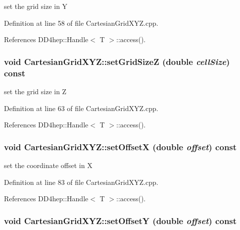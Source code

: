 set the grid size in Y 

Definition at line 58 of file CartesianGridXYZ.cpp.

References DD4hep::Handle$<$ T $>$::access().\hypertarget{class_d_d4hep_1_1_geometry_1_1_cartesian_grid_x_y_z_ac085488b1e2c7ebf657fe0ee6bc89c03}{
\subsubsection[{setGridSizeZ}]{\setlength{\rightskip}{0pt plus 5cm}void CartesianGridXYZ::setGridSizeZ (double {\em cellSize}) const}}
\label{class_d_d4hep_1_1_geometry_1_1_cartesian_grid_x_y_z_ac085488b1e2c7ebf657fe0ee6bc89c03}


set the grid size in Z 

Definition at line 63 of file CartesianGridXYZ.cpp.

References DD4hep::Handle$<$ T $>$::access().\hypertarget{class_d_d4hep_1_1_geometry_1_1_cartesian_grid_x_y_z_af10c7bf912862181974249146bf94cd3}{
\subsubsection[{setOffsetX}]{\setlength{\rightskip}{0pt plus 5cm}void CartesianGridXYZ::setOffsetX (double {\em offset}) const}}
\label{class_d_d4hep_1_1_geometry_1_1_cartesian_grid_x_y_z_af10c7bf912862181974249146bf94cd3}


set the coordinate offset in X 

Definition at line 83 of file CartesianGridXYZ.cpp.

References DD4hep::Handle$<$ T $>$::access().\hypertarget{class_d_d4hep_1_1_geometry_1_1_cartesian_grid_x_y_z_a0ba948d53028de0fbf10e1be5c15f556}{
\subsubsection[{setOffsetY}]{\setlength{\rightskip}{0pt plus 5cm}void CartesianGridXYZ::setOffsetY (double {\em offset}) const}}
\label{class_d_d4hep_1_1_geometry_1_1_cartesian_grid_x_y_z_a0ba948d53028de0fbf10e1be5c15f556}


